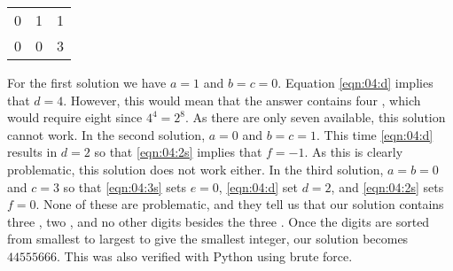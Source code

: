 \documentclass{article}
\begin{document}
{\begin{center}
\begin{tabular}{ccc}
      0   & 1   & 1   \\
      0   & 0   & 3
    \end{tabular}
  \end{center}
  For the first solution we have $a = 1$ and $b = c = 0$.
  Equation \eqref{eqn:04:d} implies that $d = 4$.
  However, this would mean that the answer contains four , which would require eight  since $4^4 = 2^8$.
  As there are only seven  available, this solution cannot work.
  In the second solution, $a = 0$ and $b = c = 1$.
  This time \eqref{eqn:04:d} results in $d = 2$ so that \eqref{eqn:04:2s} implies that $f = -1$.
  As this is clearly problematic, this solution does not work either.
  In the third solution, $a = b = 0$ and $c = 3$ so that \eqref{eqn:04:3s} sets $e = 0$, \eqref{eqn:04:d} set $d = 2$, and \eqref{eqn:04:2s} sets $f = 0$.
  None of these are problematic, and they tell us that our solution contains three , two , and no other digits besides the three .
  Once the digits are sorted from smallest to largest to give the smallest integer, our solution becomes $44555666$.
  This was also verified with Python using brute force.
}
\end{document}
